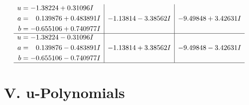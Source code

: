 \documentclass[1p]{elsarticle_modified}
\theoremstyle{definition}
\begin{document}
$$\begin{array}{c|c|c}
\begin{aligned}
u &= -1.38224 + 0.31096 I \\
a &= \phantom{-}0.139876 + 0.483891 I \\
b &= -0.655106 + 0.740977 I\end{aligned}
 & -1.13814 - 3.38562 I & -9.49848 + 3.42631 I \\ \hline\begin{aligned}
u &= -1.38224 - 0.31096 I \\
a &= \phantom{-}0.139876 - 0.483891 I \\
b &= -0.655106 - 0.740977 I\end{aligned}
 & -1.13814 + 3.38562 I & -9.49848 - 3.42631 I\\
 \hline 
 \end{array}$$\newpage
\newpage\renewcommand{\arraystretch}{1}
\centering \section*{ V. u-Polynomials}
\end{document}
